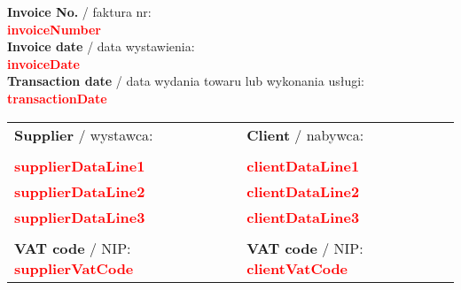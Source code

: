 \documentclass{article}
\newcommand{\VAR}[1]{
    \textbf{\textcolor{red}{#1}}
}
\begin{document}
    \newpage

    \begin{flushright}
        \textbf{Invoice No.} / faktura nr: \\
        \VAR{invoiceNumber} \\
        \vspace{0.5em}
        \textbf{Invoice date} / data wystawienia: \\
        \VAR{invoiceDate} \\
        \vspace{0.5em}
        \textbf{Transaction date} / data wydania towaru lub wykonania usługi: \\
        \VAR{transactionDate} \\
    \end{flushright}

    \vspace{1em}

    \begin{center}
        \begin{tabular}{l l}
        \textbf{Supplier} / wystawca: & \textbf{Client} / nabywca: \\
        \\
        \VAR{supplierDataLine1} & \VAR{clientDataLine1} \\
        \VAR{supplierDataLine2} & \VAR{clientDataLine2} \\
        \VAR{supplierDataLine3} & \VAR{clientDataLine3} \\
        \\
        \textbf{VAT code} / NIP: \VAR{supplierVatCode} & \textbf{VAT code} / NIP: \VAR{clientVatCode}
        \end{tabular}
    \end{center}

    \vspace{2em}

    \renewcommand\cellgape{\Gape[4pt]}
\end{document}
